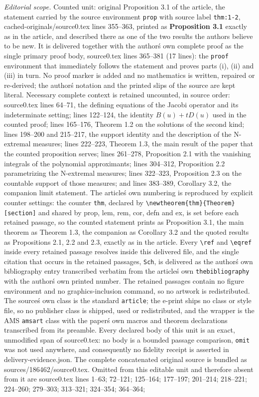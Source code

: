 \documentclass[10pt,a4paper]{amsart}
\begin{document}
\noindent\textit{Editorial scope.} Counted unit: original Proposition 3.1 of the article, the statement carried by the source environment \texttt{prop} with source label \texttt{thm:1-2}, cached-originals/source0.tex lines 355--363, printed as \textbf{Proposition 3.1} exactly as in the article, and described there as one of the two results the authors believe to be new. It is delivered together with the author\'s own complete proof as the single primary proof body, source0.tex lines 365--381 (17 lines): the \texttt{proof} environment that immediately follows the statement and proves parts (i), (ii) and (iii) in turn. No proof marker is added and no mathematics is written, repaired or re-derived; the author\'s notation and the printed slips of the source are kept literal. Necessary complete context is retained uncounted, in source order: source0.tex lines 64--71, the defining equations of the Jacobi operator and its indeterminate setting; lines 122--124, the identity $B(u)+tD(u)$ used in the counted proof; lines 165--176, Theorem 1.2 on the solutions of the second kind; lines 198--200 and 215--217, the support identity and the description of the N-extremal measures; lines 222--223, Theorem 1.3, the main result of the paper that the counted proposition serves; lines 261--278, Proposition 2.1 with the vanishing integrals of the polynomial approximants; lines 304--312, Proposition 2.2 parametrizing the N-extremal measures; lines 322--323, Proposition 2.3 on the countable support of those measures; and lines 383--389, Corollary 3.2, the companion limit statement. The article\'s own numbering is reproduced by explicit counter settings: the counter \texttt{thm}, declared by \texttt{\textbackslash newtheorem\{thm\}\{Theorem\}[section]} and shared by prop, lem, rem, cor, defn and ex, is set before each retained passage, so the counted statement prints as Proposition 3.1, the main theorem as Theorem 1.3, the companion as Corollary 3.2 and the quoted results as Propositions 2.1, 2.2 and 2.3, exactly as in the article. Every \texttt{\textbackslash ref} and \texttt{\textbackslash eqref} inside every retained passage resolves inside this delivered file, and the single citation that occurs in the retained passages, \texttt{Sch}, is delivered as the author\'s own bibliography entry transcribed verbatim from the article\'s own \texttt{thebibliography} with the author\'s own printed number. The retained passages contain no figure environment and no graphics-inclusion command, so no artwork is redistributed. The source\'s own class is the standard \texttt{article}; the e-print ships no class or style file, so no publisher class is shipped, used or redistributed, and the wrapper is the AMS \texttt{amsart} class with the paper\'s own macros and theorem declarations transcribed from its preamble. Every declared body of this unit is an exact, unmodified span of source0.tex: no body is a bounded passage comparison, \texttt{omit} was not used anywhere, and consequently no fidelity receipt is asserted in delivery-evidence.json. The complete concatenated original source is bundled as sources/186462/source0.tex. Omitted from this editable unit and therefore absent from it are source0.tex lines 1--63; 72--121; 125--164; 177--197; 201--214; 218--221; 224--260; 279--303; 313--321; 324--354; 364--364; 
\end{document}
